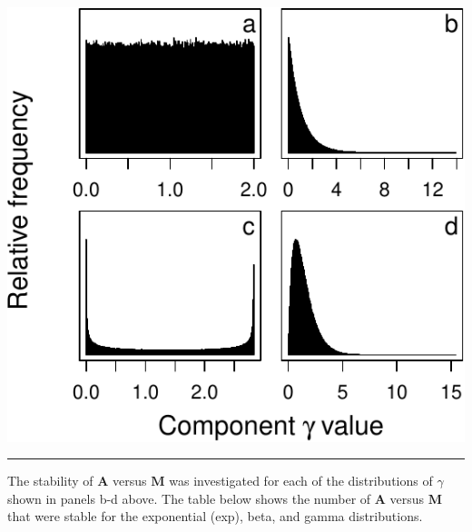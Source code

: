 \documentclass[]{article}
\begin{document}
\begin{center}\includegraphics{unnamed-chunk-21-1} \end{center}

\begin{center}\rule{0.5\linewidth}{\linethickness}\end{center}

The stability of \(\mathbf{A}\) versus \(\mathbf{M}\) was investigated
for each of the distributions of \(\gamma\) shown in panels b-d above.
The table below shows the number of \(\mathbf{A}\) versus \(\mathbf{M}\)
that were stable for the exponential (exp), beta, and gamma
distributions.
\end{document}
